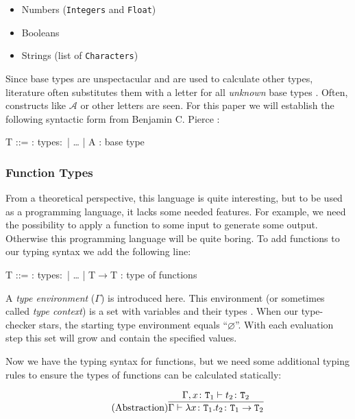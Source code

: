 \begin{itemize}
    \item Numbers (\texttt{Integers} and \texttt{Float})
    \item Booleans
    \item Strings (list of \texttt{Characters})
\end{itemize}

Since base types are unspectacular and are used to calculate other
types, literature often substitutes them with a letter for all
\textit{unknown} base types \cite{pierce2002ProgLang}. Often,
constructs like $\mathcal{A}$ or other letters are seen. For this
paper we will establish the following syntactic form
from Benjamin C. Pierce \cite{pierce2002ProgLang}:

\begin{bnfgrammar}
    T ::= : types$\colon$
    | \dots
    | A : base type
\end{bnfgrammar}

\subsubsection{Function Types}

From a theoretical perspective, this language is quite interesting, but to be used
as a programming language, it lacks some needed features. For example, we need the
possibility to apply a function to some input to generate some output. Otherwise
this programming language will be quite boring. To add functions to our typing
syntax we add the following line:

\begin{bnfgrammar}
    T ::= : types$\colon$
    | \dots
    | T$\rightarrow$T : type of functions
\end{bnfgrammar}

A \textit{type environment} ($\Gamma$) is introduced here.
This environment (or sometimes called \textit{type context}) is
a set with variables and their types \cite{pierce2002ProgLang}.
When our type-checker stars, the starting type environment equals
``$\varnothing$''. With each evaluation step this set will grow
and contain the specified values.

Now we have the typing syntax for functions, but we need some additional typing
rules to ensure the types of functions can be calculated statically:

\begin{equation*}
    \tag{Abstraction}
    \infer{
        \Gamma \vdash \lambda x \colon \texttt{T}_1 . t_2 \colon \texttt{T}_1 \rightarrow \texttt{T}_2
    }{
        \Gamma,x \colon \texttt{T}_1 \vdash t_2 \colon \texttt{T}_2
    }
\end{equation*}

